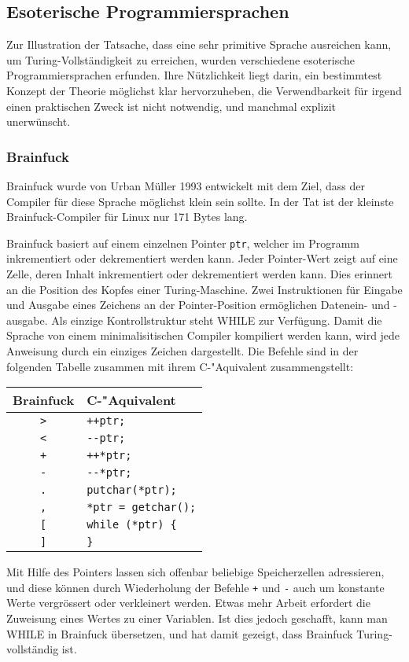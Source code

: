 \subsection{Esoterische Programmiersprachen}
Zur Illustration der Tatsache, dass eine sehr primitive Sprache
ausreichen kann, um Turing-Vollständigkeit zu erreichen, wurden
verschiedene esoterische Programmiersprachen erfunden.
Ihre Nützlichkeit liegt darin, ein bestimmtest Konzept der Theorie
möglichst klar hervorzuheben, die Verwendbarkeit für irgend einen
praktischen Zweck ist nicht notwendig, und manchmal explizit unerwünscht.

\subsubsection{Brainfuck}
Brainfuck
wurde von Urban Müller 1993 entwickelt mit dem Ziel, dass der
Compiler für diese Sprache möglichst klein sein sollte. In der
Tat ist der kleinste Brainfuck-Compiler für Linux nur 171 Bytes
lang.

Brainfuck basiert auf einem einzelnen Pointer {\tt ptr}, welcher
im Programm inkrementiert oder dekrementiert werden kann.
Jeder Pointer-Wert zeigt auf eine Zelle, deren Inhalt inkrementiert
oder dekrementiert werden kann.
Dies erinnert an die Position des Kopfes einer Turing-Maschine.
Zwei Instruktionen für Eingabe und Ausgabe eines Zeichens
an der Pointer-Position ermöglichen Datenein- und -ausgabe.
Als einzige Kontrollstruktur steht WHILE zur Verfügung. Damit
die Sprache von einem minimalisitischen Compiler kompiliert
werden kann, wird jede Anweisung durch ein einziges Zeichen
dargestellt. Die Befehle sind in der folgenden Tabelle
zusammen mit ihrem C-"Aquivalent zusammengstellt:
\begin{center}
\begin{tabular}{|c|l|}
\hline
Brainfuck&C-"Aquivalent\\
\hline
{\tt >}&\verb/++ptr;/\\
{\tt <}&\verb/--ptr;/\\
{\tt +}&\verb/++*ptr;/\\
{\tt -}&\verb/--*ptr;/\\
{\tt .}&\verb/putchar(*ptr);/\\
{\tt ,}&\verb/*ptr = getchar();/\\
{\tt [}&\verb/while (*ptr) {/\\
{\tt ]}&\verb/}/\\
\hline
\end{tabular}
\end{center}
Mit Hilfe des Pointers lassen sich offenbar beliebige Speicherzellen
adressieren, und diese können durch Wiederholung der Befehle {\tt +}
und {\tt -} auch um konstante Werte vergrössert
oder verkleinert werden. Etwas mehr Arbeit erfordert die Zuweisung
eines Wertes zu einer Variablen. Ist dies jedoch geschafft, kann
man WHILE in Brainfuck übersetzen, und hat damit gezeigt, dass
Brainfuck Turing-vollständig ist.


